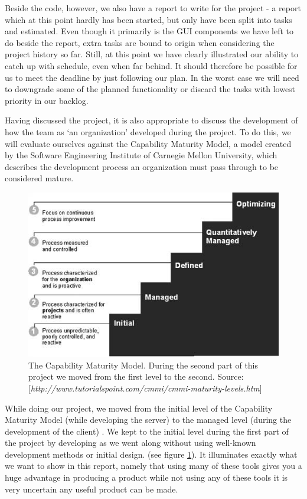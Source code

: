 Beside the code, however, we also have a report to write for the project - a report which at this point hardly has been started, but only have been split into tasks and estimated.
Even though it primarily is the GUI components we have left to do beside the report, extra tasks are bound to origin when considering the project history so far. Still, at this point we have clearly illustrated our ability to catch up with schedule, even when far behind.
It should therefore be possible for us to meet the deadline by just following our plan. In the worst case we will need to downgrade some of the planned functionality or discard the tasks with lowest priority in our backlog.

Having discussed the project, it is also appropriate to discuss the development of how the team as `an organization' developed during the project. To do this, we will evaluate ourselves against the Capability Maturity Model, a model created by the Software Engineering Institute of Carnegie Mellon University, which describes the development process an organization must pass through to be considered mature.

\begin{figure}[t]
  \includegraphics[width=\textwidth]{illustrations/CMM.jpg}
  \caption{The Capability Maturity Model. During the second part of this project we moved from the first level to the second. Source: [\textit{http://www.tutorialspoint.com/cmmi/cmmi-maturity-levels.htm}]}
  \label{fig:Capability_Maturity_Model}
\end{figure}

While doing our project, we moved from the initial level of the Capability Maturity Model (while developing the server) to the managed level (during the development of the client) \cite[p. 242]{PM}. We kept to the initial level during the first part of the project by developing as we went along without using well-known development methods or initial design.
(see figure \ref{fig:Capability_Maturity_Model}). It illuminates exactly what we want to show in this report, namely that using many of these tools gives you a huge advantage in producing a product while not using any of these tools it is very uncertain any useful product can be made.
